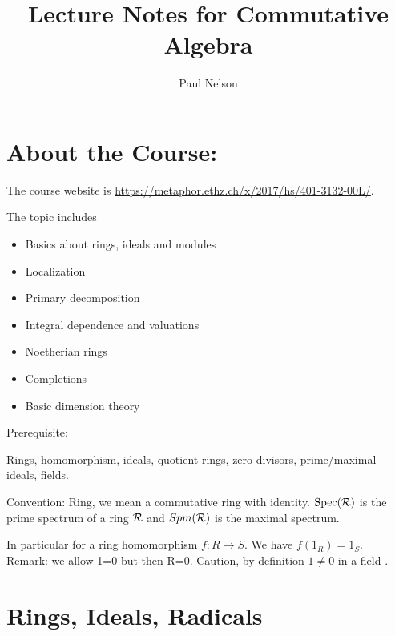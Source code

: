 \documentclass[11pt]{article}
\title{\bf Lecture Notes for Commutative Algebra}
\author{Paul Nelson} %
\newcommand{\calr}{{\cal R}}
\begin{document}
\maketitle
\tableofcontents
\newpage

\section*{About the Course:}
The course website is \href{https://metaphor.ethz.ch/x/2017/hs/401-3132-00L/}{https://metaphor.ethz.ch/x/2017/hs/401-3132-00L/}. 

The topic includes
\begin{itemize}
\item 
Basics about rings, ideals and modules
\item 
Localization
\item 
Primary decomposition
\item 
Integral dependence and valuations
\item 
Noetherian rings
\item 
Completions
\item 
Basic dimension theory
\end{itemize}
Prerequisite:

Rings, homomorphism, ideals, quotient rings, zero divisors, prime/maximal ideals, fields.

Convention: 
Ring, we mean a commutative ring with identity. $\text{Spec}(\calr)$ is the prime spectrum of a ring $\calr$ and $Spm(\calr)$ is the maximal spectrum.

In particular for a ring homomorphism $f:R\rightarrow S$. We have $f(1_R)=1_S$.
 
Remark:
we allow 1=0 but then R=0.
Caution, by definition $1\neq 0$ in a field .
\section{Rings, Ideals, Radicals}
\end{document}
